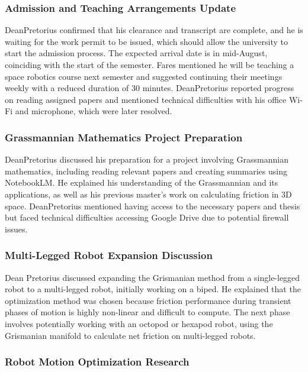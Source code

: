\subsubsection{Admission and Teaching Arrangements Update}

DeanPretorius confirmed that his clearance and transcript are complete, and he is waiting for the work permit to be issued, which should allow the university to start the admission process. The expected arrival date is in mid-August, coinciding with the start of the semester. Fares mentioned he will be teaching a space robotics course next semester and suggested continuing their meetings weekly with a reduced duration of 30 minutes. DeanPretorius reported progress on reading assigned papers and mentioned technical difficulties with his office Wi-Fi and microphone, which were later resolved.

\subsubsection{Grassmannian Mathematics Project Preparation}

DeanPretorius discussed his preparation for a project involving Grassmannian mathematics, including reading relevant papers and creating summaries using NotebookLM. He explained his understanding of the Grassmannian and its applications, as well as his previous master's work on calculating friction in 3D space. DeanPretorius mentioned having access to the necessary papers and thesis but faced technical difficulties accessing Google Drive due to potential firewall issues.

\subsubsection{Multi-Legged Robot Expansion Discussion}

Dean Pretorius discussed expanding the Grismanian method from a single-legged robot to a multi-legged robot, initially working on a biped. He explained that the optimization method was chosen because friction performance during transient phases of motion is highly non-linear and difficult to compute. The next phase involves potentially working with an octopod or hexapod robot, using the Grismanian manifold to calculate net friction on multi-legged robots.

\subsubsection{Robot Motion Optimization Research}

